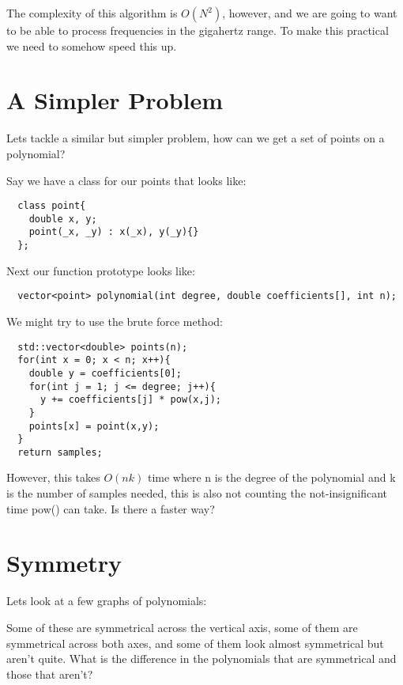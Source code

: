 \documentclass[12pt]{article}
\begin{document}
The complexity of this algorithm is $O(N^2)$, however, and we are going to want to be able to process frequencies in the gigahertz range. To make this practical we need to somehow speed this up.

\pagebreak

\section{A Simpler Problem}
Lets tackle a similar but simpler problem, how can we get a set of points on a polynomial?

Say we have a class for our points that looks like:
\begin{lstlisting}
  class point{
    double x, y;
    point(_x, _y) : x(_x), y(_y){}
  };
\end{lstlisting}

Next our function prototype looks like:
\begin{lstlisting}
  vector<point> polynomial(int degree, double coefficients[], int n);
\end{lstlisting}

We might try to use the brute force method:
\begin{lstlisting}
  std::vector<double> points(n);
  for(int x = 0; x < n; x++){
    double y = coefficients[0];
    for(int j = 1; j <= degree; j++){
      y += coefficients[j] * pow(x,j);
    }
    points[x] = point(x,y);
  }
  return samples;
\end{lstlisting}
However, this takes $O(nk)$ time where n is the degree of the polynomial and k is the number of samples needed, this is also not counting the not-insignificant time pow() can take. Is there a faster way?

\section{Symmetry}
Lets look at a few graphs of polynomials:

\begin{multicols}{2}


\end{multicols}

Some of these are symmetrical across the vertical axis, some of them are symmetrical across both axes, and some of them look almost symmetrical but aren't quite. What is the difference in the polynomials that are symmetrical and those that aren't?
\end{document}
